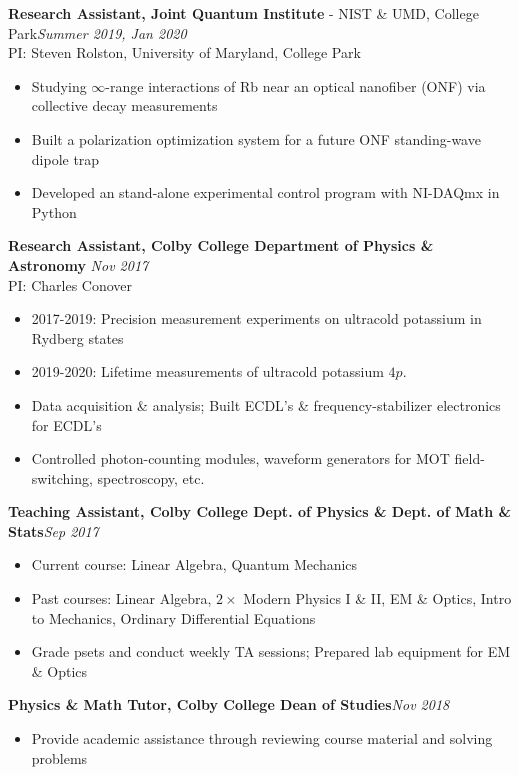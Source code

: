 \documentclass[letter, 10pt]{article}
\begin{document}
	\noindent \textbf{Research Assistant, Joint Quantum Institute} - NIST \& UMD, College Park\hfill \textit{Summer 2019, Jan 2020} \\ 
	\noindent PI: {Steven Rolston}, University of Maryland, College Park
	\begin{itemize}[noitemsep, nolistsep]
		\item Studying $\infty$-range interactions of Rb near an optical nanofiber (ONF) via collective decay measurements
		\item Built a polarization optimization system for a future ONF standing-wave dipole trap 
		\item Developed an stand-alone experimental control program with NI-DAQmx in Python
	\end{itemize}
	\textbf{Research Assistant, Colby College Department of Physics \& Astronomy}\hfill\textit{ Nov 2017\textemdash}\\
	PI: {Charles Conover}
	\begin{itemize}[noitemsep, nolistsep]
		\item 2017-2019: Precision measurement experiments on ultracold potassium in Rydberg states
		\item 2019-2020: Lifetime measurements of ultracold potassium $4p$. 
		\item Data acquisition \& analysis; Built ECDL's \& frequency-stabilizer electronics for ECDL's
		\item Controlled photon-counting modules, waveform generators for MOT field-switching, spectroscopy, etc.

	\end{itemize}	
 	\textbf{Teaching Assistant, Colby College Dept. of Physics \& Dept. of Math \& Stats}\hfill \textit{Sep  2017\textemdash}  
	\begin{itemize}[noitemsep, nolistsep]
		\item Current course: Linear Algebra, Quantum Mechanics
		\item Past courses: Linear Algebra, $2\times$ Modern Physics I \& II, EM \& Optics, Intro to Mechanics, Ordinary Differential Equations
		\item Grade psets and conduct weekly TA sessions; Prepared lab equipment for EM \& Optics
	\end{itemize}
	\textbf{Physics \& Math Tutor, Colby College Dean of Studies}\hfill \textit{Nov 2018\textemdash }
	\begin{itemize}[noitemsep, nolistsep]
		\item Provide academic assistance through reviewing course material and solving problems\\
	\end{itemize}
	
\end{document}
